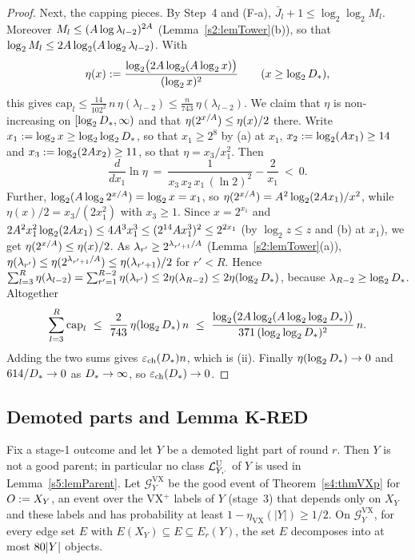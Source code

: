 \begin{proof}
Next, the capping pieces. By Step~4 and (F-a), $\bar J_l+1\le\log_2\log_2M_l$. Moreover $M_l\le(A\log\lambda_{l-2})^{2A}$ (Lemma~\ref{s2:lemTower}(b)), so that $\log_2M_l\le2A\log_2(A\log_2\lambda_{l-2})$. With
\[
\eta(x)\mathrel{:=}\frac{\log_2\bigl(2A\log_2(A\log_2x)\bigr)}{(\log_2x)^2}\qquad(x\ge\log_2D_{*}),
\]
this gives $\mathrm{cap}_l\le\frac{14}{102^2}\,n\,\eta(\lambda_{l-2})\le\frac{n}{743}\,\eta(\lambda_{l-2})$. We claim that $\eta$ is non-increasing on $[\log_2D_{*},\infty)$ and that $\eta(2^{x/A})\le\eta(x)/2$ there. Write $x_1\mathrel{:=}\log_2x\ge\log_2\log_2D_{*}$, so that $x_1\ge2^8$ by (a) at $x_1$, $x_2\mathrel{:=}\log_2(A x_1)\ge14$ and $x_3\mathrel{:=}\log_2(2A x_2)\ge11$, so that $\eta=x_3/x_1^2$. Then
\[
\frac{d}{dx_1}\ln\eta\ =\ \frac{1}{x_3\,x_2\,x_1\,(\ln2)^2}-\frac2{x_1}\ <\ 0 .
\]
Further, $\log_2(A\log_2 2^{x/A})=\log_2x=x_1$, so $\eta(2^{x/A})=A^2\log_2(2A x_1)/x^2$, while $\eta(x)/2=x_3/(2x_1^2)$ with $x_3\ge1$. Since $x=2^{x_1}$ and $2A^2x_1^2\log_2(2A x_1)\le4A^3x_1^3\le(2^{14}A x_1^3)^2\le2^{2x_1}$ (by $\log_2z\le z$ and (b) at $x_1$), we get $\eta(2^{x/A})\le\eta(x)/2$. As $\lambda_{r'}\ge2^{\lambda_{r'+1}/A}$ (Lemma~\ref{s2:lemTower}(a)), $\eta(\lambda_{r'})\le\eta(2^{\lambda_{r'+1}/A})\le\eta(\lambda_{r'+1})/2$ for $r'<R$. Hence $\sum_{l=3}^R\eta(\lambda_{l-2})=\sum_{r'=1}^{R-2}\eta(\lambda_{r'})\le2\eta(\lambda_{R-2})\le2\eta(\log_2D_{*})$, because $\lambda_{R-2}\ge\log_2D_{*}$. Altogether
\[
\sum_{l=3}^R\mathrm{cap}_l\ \le\ \frac{2}{743}\,\eta(\log_2\Dstar)\,n\ \le\ \frac{\log_2\bigl(2\Aexp\log_2(\Aexp\log_2\log_2\Dstar)\bigr)}{371\,(\log_2\log_2\Dstar)^2}\,n .
\]
Adding the two sums gives $\varepsilon_{\mathrm{ch}}(D_{*})n$, which is (ii). Finally $\eta(\log_2D_{*})\to0$ and $614/D_{*}\to0$ as $D_{*}\to\infty$, so $\varepsilon_{\mathrm{ch}}(D_{*})\to0$.
\end{proof}

\subsection{Demoted parts and Lemma K-RED}

\begin{lemma}\label{s5:lemDemoted}
Fix a stage-1 outcome and let $Y$ be a demoted light part of round $r$. Then $Y$ is not a good parent; in particular no class $\mathcal{L}^{\mathrm{U}}_{Y,\cdot}$ of $Y$ is used in Lemma~\ref{s5:lemParent}. Let $\mathcal G^{\mathrm{VX}}_Y$ be the good event of Theorem~\ref{s4:thmVXp} for $O\mathrel{:=} X_Y$, an event over the VX$^+$ labels of $Y$ (stage~3) that depends only on $X_Y$ and these labels and has probability at least $1-\eta_{\mathrm{VX}}(|Y|)\ge1/2$. On $\mathcal G^{\mathrm{VX}}_Y$, for every edge set $E$ with $E(X_Y)\subseteq E\subseteq E_r(Y)$, the set $E$ decomposes into at most $80|Y|$ objects.
\deps{\ref{s4:thmVXp}, \ref{s2:propStructure}, \ref{s3:lemCOLJV}, \ref{s2:lemTower}, \ref{s1:condG1}, \ref{s1:condG3}, \ref{s5:defStages}, \ref{s5:lemParent}}
\end{lemma}

